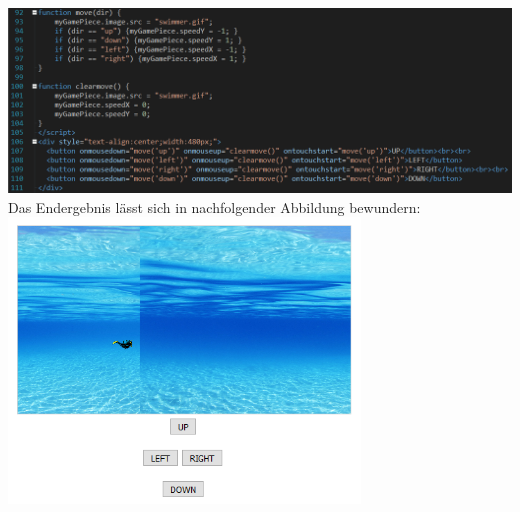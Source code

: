 \newline
\includegraphics[width=1\textwidth]{img/vincent/abb08.png}
\newline
Das Endergebnis l\"asst sich in nachfolgender Abbildung bewundern:
\newline
\includegraphics[width=0.7\textwidth]{img/vincent/abb09.png}
\newline
